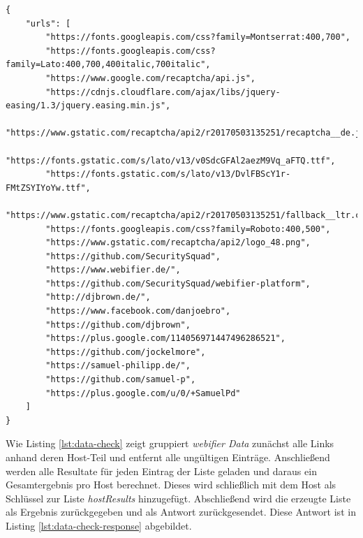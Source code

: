 \begin{scriptsize}
\begin{lstlisting}
{
    "urls": [
        "https://fonts.googleapis.com/css?family=Montserrat:400,700",
        "https://fonts.googleapis.com/css?family=Lato:400,700,400italic,700italic",
        "https://www.google.com/recaptcha/api.js",
        "https://cdnjs.cloudflare.com/ajax/libs/jquery-easing/1.3/jquery.easing.min.js",
        "https://www.gstatic.com/recaptcha/api2/r20170503135251/recaptcha__de.js",
        "https://fonts.gstatic.com/s/lato/v13/v0SdcGFAl2aezM9Vq_aFTQ.ttf",
        "https://fonts.gstatic.com/s/lato/v13/DvlFBScY1r-FMtZSYIYoYw.ttf",
        "https://www.gstatic.com/recaptcha/api2/r20170503135251/fallback__ltr.css",
        "https://fonts.googleapis.com/css?family=Roboto:400,500",
        "https://www.gstatic.com/recaptcha/api2/logo_48.png",
        "https://github.com/SecuritySquad",
        "https://www.webifier.de/",
        "https://github.com/SecuritySquad/webifier-platform",
        "http://djbrown.de/",
        "https://www.facebook.com/danjoebro",
        "https://github.com/djbrown",
        "https://plus.google.com/114056971447496286521",
        "https://github.com/jockelmore",
        "https://samuel-philipp.de/",
        "https://github.com/samuel-p",
        "https://plus.google.com/u/0/+SamuelPd"
    ]
}
\end{lstlisting}
\end{scriptsize}

Wie Listing \ref{lst:data-check} zeigt gruppiert \textit{webifier Data} zunächst alle Links anhand
deren Host-Teil und entfernt alle ungültigen Einträge. Anschließend werden alle Resultate für jeden
Eintrag der Liste geladen und daraus ein Gesamtergebnis pro Host berechnet. Dieses wird schließlich
mit dem Host als Schlüssel zur Liste \textit{hostResults} hinzugefügt. Abschließend wird die
erzeugte Liste als Ergebnis zurückgegeben und als Antwort zurückgesendet. Diese Antwort ist in Listing \ref{lst:data-check-response} abgebildet.

\newpage

